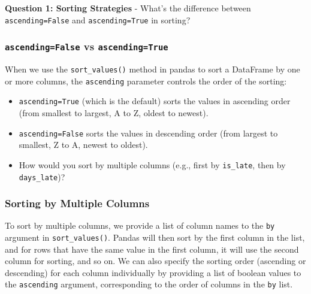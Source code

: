 \documentclass[
  letterpaper,
  DIV=11,
  numbers=noendperiod]{scrartcl}
\begin{document}
\begin{tcolorbox}[enhanced jigsaw, colframe=quarto-callout-important-color-frame, title=\textcolor{quarto-callout-important-color}{\faExclamation}\hspace{0.5em}{🤔 Discussion Questions: Sort Mental Model}, breakable, opacityback=0, arc=.35mm, leftrule=.75mm, titlerule=0mm, left=2mm, toptitle=1mm, rightrule=.15mm, bottomtitle=1mm, bottomrule=.15mm, opacitybacktitle=0.6, toprule=.15mm, colback=white, coltitle=black, colbacktitle=quarto-callout-important-color!10!white]

\textbf{Question 1: Sorting Strategies} - What's the difference between
\texttt{ascending=False} and \texttt{ascending=True} in sorting?

\subsubsection{\texorpdfstring{\texttt{ascending=False} vs
\texttt{ascending=True}}{ascending=False vs ascending=True}}\label{ascendingfalse-vs-ascendingtrue}

When we use the \texttt{sort\_values()} method in pandas to sort a
DataFrame by one or more columns, the \texttt{ascending} parameter
controls the order of the sorting:

\begin{itemize}
\item
  \texttt{ascending=True} (which is the default) sorts the values in
  ascending order (from smallest to largest, A to Z, oldest to newest).
\item
  \texttt{ascending=False} sorts the values in descending order (from
  largest to smallest, Z to A, newest to oldest).
\item
  How would you sort by multiple columns (e.g., first by
  \texttt{is\_late}, then by \texttt{days\_late})?
\end{itemize}

\subsubsection{Sorting by Multiple
Columns}\label{sorting-by-multiple-columns}

To sort by multiple columns, we provide a list of column names to the
\texttt{by} argument in \texttt{sort\_values()}. Pandas will then sort
by the first column in the list, and for rows that have the same value
in the first column, it will use the second column for sorting, and so
on. We can also specify the sorting order (ascending or descending) for
each column individually by providing a list of boolean values to the
\texttt{ascending} argument, corresponding to the order of columns in
the \texttt{by} list.


\end{tcolorbox}
\end{document}
